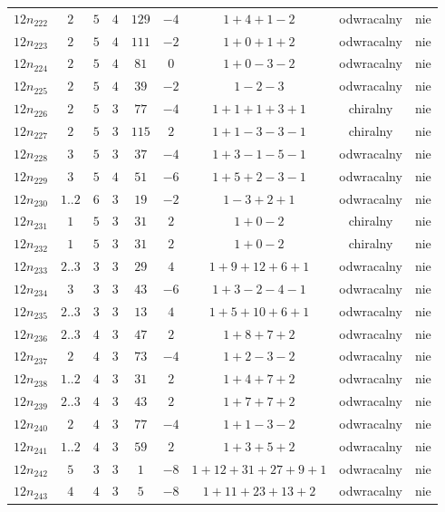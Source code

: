 \begin{longtable}{ccccccccc}
$12n_{222}$ & $2$ & $5$ & $4$ & $129$ & $-4$ & $1+4+1-2$ & odwracalny & nie \\
$12n_{223}$ & $2$ & $5$ & $4$ & $111$ & $-2$ & $1+0+1+2$ & odwracalny & nie \\
$12n_{224}$ & $2$ & $5$ & $4$ & $81$ & $0$ & $1+0-3-2$ & odwracalny & nie \\
$12n_{225}$ & $2$ & $5$ & $4$ & $39$ & $-2$ & $1-2-3$ & odwracalny & nie \\
$12n_{226}$ & $2$ & $5$ & $3$ & $77$ & $-4$ & $1+1+1+3+1$ & chiralny & nie \\
$12n_{227}$ & $2$ & $5$ & $3$ & $115$ & $2$ & $1+1-3-3-1$ & chiralny & nie \\
$12n_{228}$ & $3$ & $5$ & $3$ & $37$ & $-4$ & $1+3-1-5-1$ & odwracalny & nie \\
$12n_{229}$ & $3$ & $5$ & $4$ & $51$ & $-6$ & $1+5+2-3-1$ & odwracalny & nie \\
$12n_{230}$ & $1..2$ & $6$ & $3$ & $19$ & $-2$ & $1-3+2+1$ & odwracalny & nie \\
$12n_{231}$ & $1$ & $5$ & $3$ & $31$ & $2$ & $1+0-2$ & chiralny & nie \\
$12n_{232}$ & $1$ & $5$ & $3$ & $31$ & $2$ & $1+0-2$ & chiralny & nie \\
$12n_{233}$ & $2..3$ & $3$ & $3$ & $29$ & $4$ & $1+9+12+6+1$ & odwracalny & nie \\
$12n_{234}$ & $3$ & $3$ & $3$ & $43$ & $-6$ & $1+3-2-4-1$ & odwracalny & nie \\
$12n_{235}$ & $2..3$ & $3$ & $3$ & $13$ & $4$ & $1+5+10+6+1$ & odwracalny & nie \\
$12n_{236}$ & $2..3$ & $4$ & $3$ & $47$ & $2$ & $1+8+7+2$ & odwracalny & nie \\
$12n_{237}$ & $2$ & $4$ & $3$ & $73$ & $-4$ & $1+2-3-2$ & odwracalny & nie \\
$12n_{238}$ & $1..2$ & $4$ & $3$ & $31$ & $2$ & $1+4+7+2$ & odwracalny & nie \\
$12n_{239}$ & $2..3$ & $4$ & $3$ & $43$ & $2$ & $1+7+7+2$ & odwracalny & nie \\
$12n_{240}$ & $2$ & $4$ & $3$ & $77$ & $-4$ & $1+1-3-2$ & odwracalny & nie \\
$12n_{241}$ & $1..2$ & $4$ & $3$ & $59$ & $2$ & $1+3+5+2$ & odwracalny & nie \\
$12n_{242}$ & $5$ & $3$ & $3$ & $1$ & $-8$ & $1+12+31+27+9+1$ & odwracalny & nie \\
$12n_{243}$ & $4$ & $4$ & $3$ & $5$ & $-8$ & $1+11+23+13+2$ & odwracalny & nie \\

\end{longtable}
